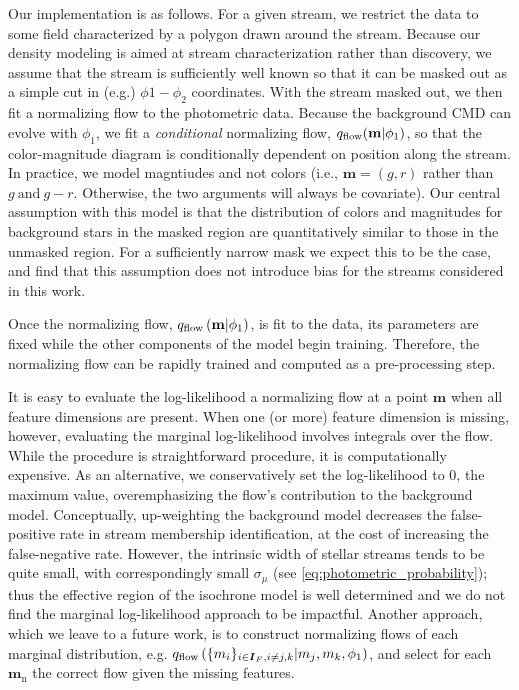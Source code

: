 \documentclass[twocolumn]{aastex631}
\newcommand{\mrm}[1]{\mathrm{#1}}
\newcommand{\mbs}[1]{\boldsymbol{#1}}
\newcommand{\nth}[1]{{#1}_{\mrm{n}}}  %
\begin{document}
            Our implementation is as follows. For a given stream, we restrict the data to some field characterized by a polygon drawn around the stream. Because our density modeling is aimed at stream characterization rather than discovery, we assume that the stream is sufficiently well known so that it can be masked out as a simple cut in (e.g.) $\phi1-\phi_2$ coordinates. With the stream masked out, we then fit a normalizing flow to the photometric data. Because the background CMD can evolve with $\phi_1$, we fit a \emph{conditional} normalizing flow, $q_{\rm flow}(\mathbf{m}|\phi_1)$, so that the color-magnitude diagram is conditionally dependent on position along the stream. In practice, we model magntiudes and not colors (i.e., $\mathbf{m} = (g,r)$ rather than $g \ \mathrm{and} \ g-r$. Otherwise, the two arguments will always be covariate). Our central assumption with this model is that the distribution of colors and magnitudes for background stars in the masked region are quantitatively similar to those in the unmasked region. For a sufficiently narrow mask we expect this to be the case, and find that this assumption does not introduce bias for the streams considered in this work.
                
            Once the normalizing flow, $q_{\rm flow}\left(\mathbf{m} | \phi_1\right)$, is fit to the data, its parameters are fixed while the other components of the model begin training. Therefore, the normalizing flow can be rapidly trained and computed as a pre-processing step.

            It is easy to evaluate the log-likelihood a normalizing flow at a point $\mbs{m}$ when all feature dimensions are present. When one (or more) feature dimension is missing, however, evaluating the marginal log-likelihood involves integrals over the flow. While the procedure is straightforward procedure, it is computationally expensive. As an alternative, we conservatively set the log-likelihood to $0$, the maximum value, overemphasizing the flow's contribution to the background model. Conceptually, up-weighting the background model decreases the false-positive rate in stream membership identification, at the
            cost of increasing the false-negative rate. However, the intrinsic width of stellar streams tends to be quite small, with correspondingly small $\sigma_\mu$ (see \autoref{eq:photometric_probability}); thus the effective region of the isochrone model is well determined and we do not find the marginal log-likelihood approach to be impactful. Another approach, which we leave to a future work, is to construct normalizing flows of each marginal distribution, e.g. $q_{\rm flow}\left(\{m_i\}_{i \in \mbs{I}_F, i \neq {j, k}} | m_j, m_k, \phi_1\right)$, and select for each $\nth{\mbs{m}}$ the correct flow given the missing features.
\end{document}
